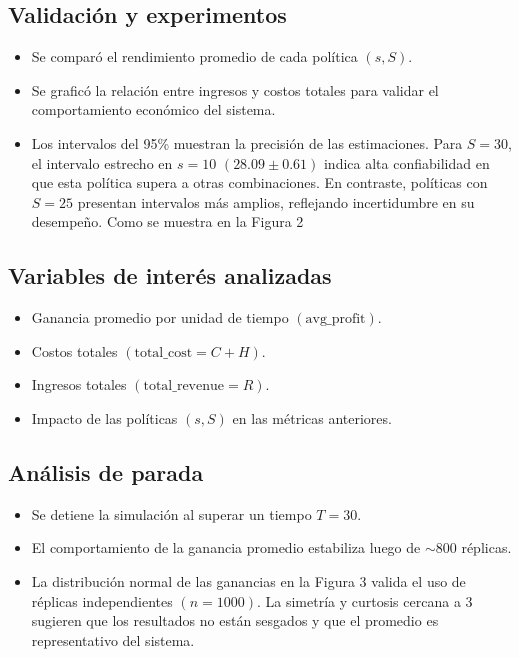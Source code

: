 \documentclass{report}
\begin{document}
\subsection*{Validación y experimentos}

\begin{itemize}
\item Se comparó el rendimiento promedio de cada política \((s, S)\).
\item Se graficó la relación entre ingresos y costos totales para validar el comportamiento 
económico del sistema.
\item Los intervalos del 95\% muestran la precisión de las estimaciones. Para \(S=30\), 
el intervalo estrecho en \(s=10\) \((28.09 \pm 0.61)\) indica alta confiabilidad en que esta 
política supera a otras combinaciones. En contraste, políticas con \(S=25\) presentan intervalos 
más amplios, reflejando incertidumbre en su desempeño. Como se muestra en la Figura 2
\end{itemize}

\subsection*{Variables de interés analizadas}

\begin{itemize}
  \item Ganancia promedio por unidad de tiempo \((\text{avg\_profit})\).
  \item Costos totales \((\text{total\_cost} = C + H)\).
  \item Ingresos totales \((\text{total\_revenue} = R)\).
  \item Impacto de las políticas \((s, S)\) en las métricas anteriores.
\end{itemize}

\subsection*{Análisis de parada}

\begin{itemize}
\item Se detiene la simulación al superar un tiempo \(T = 30\).
\item El comportamiento de la ganancia promedio estabiliza luego de $\sim$800 réplicas.
\item La distribución normal de las ganancias en la Figura 3 valida el uso de réplicas independientes 
\((n=1000)\). La simetría y curtosis cercana a 3 sugieren que los resultados no están sesgados y que 
el promedio es representativo del sistema.
\end{itemize}
\end{document}
